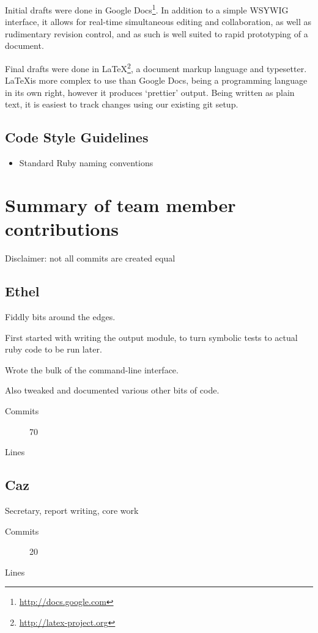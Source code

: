       Initial drafts were done in Google Docs\footnote{\url{http://docs.google.com}}.
      In addition to a simple WSYWIG interface, it allows for real-time simultaneous editing and collaboration, as well as rudimentary revision control, and as such is well suited to rapid prototyping of a document.

      Final drafts were done in \LaTeX\footnote{\url{http://latex-project.org}}, a document markup language and typesetter.
      \LaTeX is more complex to use than Google Docs, being a programming language in its own right, however it produces `prettier' output.
      Being written as plain text, it is easiest to track changes using our existing git setup.

  \subsection{Code Style Guidelines}
    \begin{itemize}
      \item Standard Ruby naming conventions
    \end{itemize}


\section{Summary of team member contributions}
Disclaimer: not all commits are created equal

  \subsection{Ethel}
    Fiddly bits around the edges.

    First started with writing the output module, to turn symbolic tests to actual ruby code to be run later.

    Wrote the bulk of the command-line interface.

    Also tweaked and documented various other bits of code.
    \begin{description}
      \item[Commits] 70
      \item[Lines]
    \end{description}

  \subsection{Caz}
    Secretary, report writing, core work
    \begin{description}
      \item[Commits] 20
      \item[Lines]
    \end{description}


